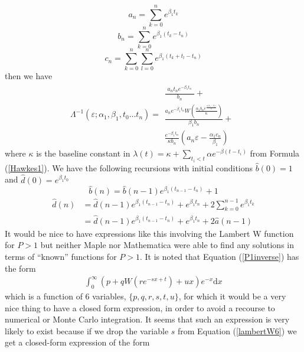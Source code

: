 \documentclass{amsart}
\newcommand{\mathd}{\mathrm{d}}
\begin{document}
\begin{equation}
  a_n = \sum_{k = 0}^n e^{\beta_1 t_k}
\end{equation}
\begin{equation}
  b_n = \sum_{k = 0}^n e^{\beta_1 ( t_k - t_n)}
\end{equation}
\begin{equation}
  c_n = \sum_{k = 0}^n \sum_{l = 0}^n e^{\beta_1 ( t_k + t_l - t_n)}
\end{equation}
then we have
\begin{equation}
  \Lambda^{- 1} ( \varepsilon ; \alpha_1, \beta_1, t_0 \ldots t_n) =
  \begin{array}{l}
    \frac{\begin{array}{l}
      a_n t_n e^{- \beta_1 t_n}
    \end{array}}{b_n} +\\
    \frac{a_n e^{- \beta_1 t_n} W \left( \frac{\alpha_1 b_n e^{\frac{\alpha_1
    b_n - \beta_1 \varepsilon}{\kappa}}}{\kappa} \right)}{\beta_1 b_n} +\\
    \frac{e^{- \beta_1 t_n}}{\kappa b_n} \left( a_n \varepsilon -
    \frac{\alpha_1 c_n}{\beta_1} \right)
  \end{array} \label{P1pred}
\end{equation}
where $\kappa$ is the baseline constant in $\lambda ( t) = \kappa + \sum_{t_i
< t} \alpha e^{- \beta ( t - t_i)}$ from Formula (\ref{Hawkes1}). We have the
following recursions with initial conditions $\hat{b} ( 0) = 1$ and $\hat{d} (
0) = e^{\beta_1 t_0}$
\begin{equation}
  \hat{b} ( n) = \hat{b} ( n - 1) e^{\beta_1 ( t_{n - 1} - t_n)} + 1
\end{equation}
\begin{equation}
  \begin{array}{ll}
    \hat{d} ( n) & = \hat{d} ( n - 1) e^{\beta_1 ( t_{n - 1} - t_n)} +
    e^{\beta_1 t_n} + 2 \sum_{k = 0}^{n - 1} e^{\beta_1 t_k}\\
    & = \hat{d} ( n - 1) e^{\beta_1 ( t_{n - 1} - t_n)} + e^{\beta_1 t_n} + 2
    \hat{a} ( n - 1)
  \end{array}
\end{equation}
It would be nice to have expressions like this involving the Lambert W
function for $P > 1$ but neither Maple nor Mathematica were able to find any
solutions in terms of ``known'' functions for $P > 1$. It is noted that
Equation (\ref{P1inverse}) has the form
\begin{equation}
  \begin{array}{l}
    \int_0^{\infty} ( p + q W ( r e^{- s x + t}) + u x) e^{- x} \mathd x
    \label{lambertW6}
  \end{array}
\end{equation}
which is a function of 6 variables, $\{ p, q, r, s, t, u \}$, for which it
would be a very nice thing to have a closed form expression, in order to avoid
a recourse to numerical or Monte Carlo integration. It seems that such an
expression is very likely to exist because if we drop the variable $s$ from
Equation (\ref{lambertW6}) we get a closed-form expression of the form
\end{document}
